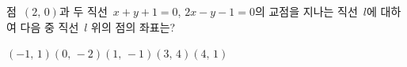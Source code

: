 점~$(2,\,0)$과 두 직선~$x+y+1=0$, $2x-y-1=0$의 교점을 지나는 직선~$l$에 대하여 다음 중 직선~$l$ 위의 점의 좌표는?
\begin{choices32}{$(-1,\,1)$}{$(0,\,-2)$}{$(1,\,-1)$}{$(3,\,4)$}{$(4,\,1)$}\end{choices32}
